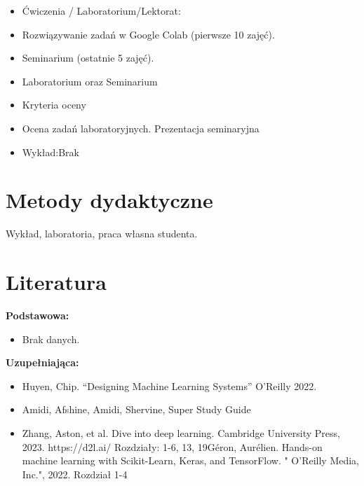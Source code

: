 \documentclass[12pt, a4paper]{article}
\begin{document}
\begin{itemize}
  \item Ćwiczenia / Laboratorium/Lektorat:
  \item Rozwiązywanie zadań w Google Colab (pierwsze 10 zajęć).
  \item Seminarium (ostatnie 5 zajęć).
  \item Laboratorium oraz Seminarium
  \item Kryteria oceny
  \item Ocena zadań laboratoryjnych.  Prezentacja seminaryjna
  \item Wykład:Brak
\end{itemize}

\section{Metody dydaktyczne}

Wykład, laboratoria, praca własna studenta.

\section{Literatura}

\textbf{Podstawowa:}
\begin{itemize}
  \item Brak danych.
\end{itemize}

\textbf{Uzupełniająca:}
\begin{itemize}
  \item Huyen, Chip. “Designing Machine Learning Systems” O’Reilly 2022.
  \item Amidi, Afshine, Amidi, Shervine, Super Study Guide
  \item Zhang, Aston, et al. Dive into deep learning. Cambridge University Press, 2023. https://d2l.ai/ Rozdziały: 1-6, 13, 19Géron, Aurélien. Hands-on machine learning with Scikit-Learn, Keras, and TensorFlow. " O'Reilly Media, Inc.", 2022.  Rozdział 1-4
\end{itemize}
\end{document}
